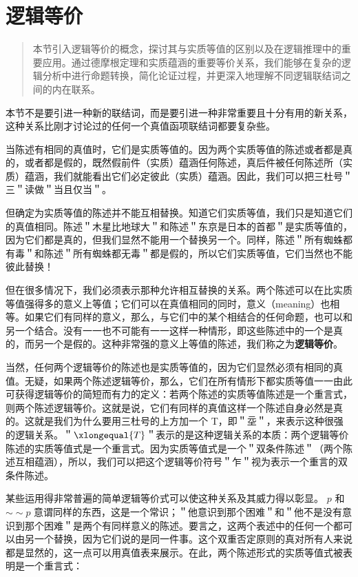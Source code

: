 \section{逻辑等价}

\begin{quotation}
本节引入逻辑等价的概念，探讨其与实质等值的区别以及在逻辑推理中的重要应用。通过德摩根定理和实质蕴涵的重要等价关系，我们能够在复杂的逻辑分析中进行命题转换，简化论证过程，并更深入地理解不同逻辑联结词之间的内在联系。
\end{quotation}

本节不是要引进一种新的联结词，而是要引进一种非常重要且十分有用的新关系，这种关系比刚才讨论过的任何一个真值函项联结词都要复杂些。

当陈述有相同的真值时，它们是实质等值的。因为两个实质等值的陈述或者都是真的，或者都是假的，既然假前件（实质）蕴涵任何陈述，真后件被任何陈述所（实质）蕴涵，我们就能看出它们必定彼此（实质）蕴涵。因此，我们可以把三杜号＂三＂读做＂当且仅当＂。

但确定为实质等值的陈述并不能互相替换。知道它们实质等值，我们只是知道它们的真值相同。陈述＂木星比地球大＂和陈述＂东京是日本的首都＂是实质等值的，因为它们都是真的，但我们显然不能用一个替换另一个。同样，陈述＂所有蜘蛛都有毒＂和陈述＂所有蜘蛛都无毒＂都是假的，所以它们实质等值，它们当然也不能彼此替换！

但在很多情况下，我们必须表示那种允许相互替换的关系。两个陈述可以在比实质等值强得多的意义上等值；它们可以在真值相同的同时，意义（meaning）也相等。如果它们有同样的意义，那么，与它们中的某个相结合的任何命题，也可以和另一个结合。没有一一也不可能有一一这样一种情形，即这些陈述中的一个是真的，而另一个是假的。这种非常强的意义上等值的陈述，我们称之为\textbf{逻辑等价}。

当然，任何两个逻辑等价的陈述也是实质等值的，因为它们显然必须有相同的真值。无疑，如果两个陈述逻辑等价，那么，它们在所有情形下都实质等值一一由此可获得逻辑等价的简短而有力的定义：若两个陈述的实质等值陈述是一个重言式，则两个陈述逻辑等价。这就是说，它们有同样的真值这样一个陈述自身必然是真的。这就是我们为什么要用三杜号的上方加一个 T，即＂坖＂，来表示这种很强的逻辑关系。＂$\xlongequal{T}$＂表示的是这种逻辑关系的本质：两个逻辑等价陈述的实质等值式是一个重言式。因为实质等值式是一个＂双条件陈述＂（两个陈述互相蕴涵），所以，我们可以把这个逻辑等价符号＂乍＂视为表示一个重言的双条件陈述。

某些运用得非常普遍的简单逻辑等价式可以使这种关系及其威力得以彰显。 $p$ 和 $\sim \sim p$ 意谓同样的东西，这是一个常识；＂他意识到那个困难＂和＂他不是没有意识到那个困难＂是两个有同样意义的陈述。要言之，这两个表述中的任何一个都可以由另一个替换，因为它们说的是同一件事。这个双重否定原则的真对所有人来说都是显然的，这一点可以用真值表来展示。在此，两个陈述形式的实质等值式被表明是一个重言式：

